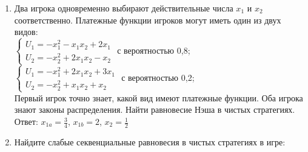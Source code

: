 \documentclass[pdftex,12pt,a4paper]{article}
\begin{document}
\begin{enumerate}
\item Два игрока одновременно выбирают действительные числа $x_{1}$ и $x_{2}$  соответственно. Платежные функции игроков могут иметь один из двух видов: \\
$\left\{
\begin{array}{c}
U_{1}=-x_{1}^{2}-x_{1}x_{2}+2x_{1} \\
U_{2}=-x_{2}^{2}+2x_{1}x_{2}-x_{2}
\end{array}\right.$ с вероятностью 0,8;\\
$\left\{
\begin{array}{c}
U_{1}=-x_{1}^{2}+2x_{1}x_{2}+3x_{1} \\
U_{2}=-x_{2}^{2}+x_{1}x_{2}+x_{2}
\end{array}\right.$ с вероятностью 0,2;\\
Первый игрок точно знает, какой вид имеют платежные функции. Оба игрока знают законы распределения. Найти равновесие Нэша в чистых стратегиях.\\
Ответ: $x_{1a}=\frac{3}{4}$, $x_{1b}=2$, $x_{2}=\frac{1}{2}$ 

\item Найдите слабые секвенциальные равновесия в чистых стратегиях в игре: \\

\end{enumerate}
\end{document}
